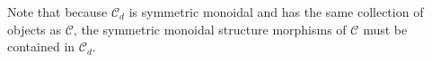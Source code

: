 \documentclass[11pt,a4paper]{article}
\theoremstyle{plain}
\theoremstyle{definition}
\newtheorem{definition}[theorem]{Definition}
\newtheorem{remark}[theorem]{Remark}
\newcommand{\C}{\mathscr{C}}
\newcommand{\op}{\mathrm{op}}
\newcommand{\todo}[1]{\textcolor{red}{\small #1}}
\begin{document}


Note that because $\C_d$ is symmetric monoidal and has the same collection of objects as $\C$, the symmetric monoidal structure morphisms of $\C$ must be contained in $\C_d$.
\end{document}
